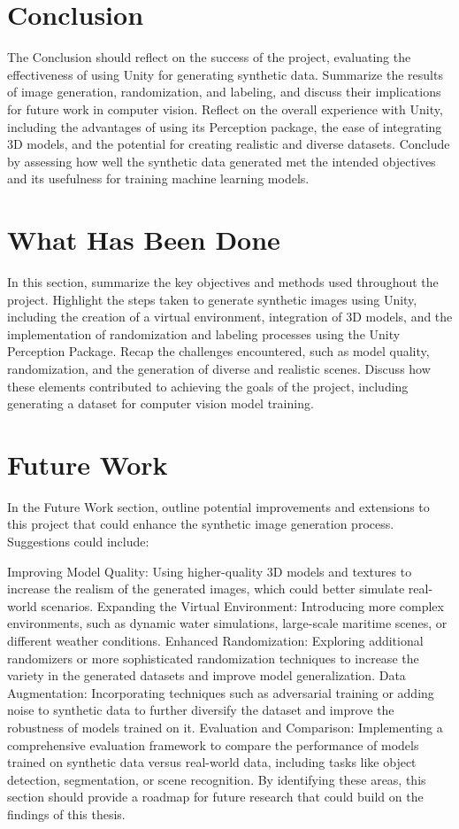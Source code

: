 \section{Conclusion}
The Conclusion should reflect on the success of the project, evaluating the effectiveness of using Unity for generating synthetic data. Summarize the results of image generation, randomization, and labeling, and discuss their implications for future work in computer vision. Reflect on the overall experience with Unity, including the advantages of using its Perception package, the ease of integrating 3D models, and the potential for creating realistic and diverse datasets. Conclude by assessing how well the synthetic data generated met the intended objectives and its usefulness for training machine learning models.

\section{What Has Been Done}
In this section, summarize the key objectives and methods used throughout the project. Highlight the steps taken to generate synthetic images using Unity, including the creation of a virtual environment, integration of 3D models, and the implementation of randomization and labeling processes using the Unity Perception Package. Recap the challenges encountered, such as model quality, randomization, and the generation of diverse and realistic scenes. Discuss how these elements contributed to achieving the goals of the project, including generating a dataset for computer vision model training.


\section{Future Work}
In the Future Work section, outline potential improvements and extensions to this project that could enhance the synthetic image generation process. Suggestions could include:

Improving Model Quality: Using higher-quality 3D models and textures to increase the realism of the generated images, which could better simulate real-world scenarios.
Expanding the Virtual Environment: Introducing more complex environments, such as dynamic water simulations, large-scale maritime scenes, or different weather conditions.
Enhanced Randomization: Exploring additional randomizers or more sophisticated randomization techniques to increase the variety in the generated datasets and improve model generalization.
Data Augmentation: Incorporating techniques such as adversarial training or adding noise to synthetic data to further diversify the dataset and improve the robustness of models trained on it.
Evaluation and Comparison: Implementing a comprehensive evaluation framework to compare the performance of models trained on synthetic data versus real-world data, including tasks like object detection, segmentation, or scene recognition.
By identifying these areas, this section should provide a roadmap for future research that could build on the findings of this thesis.

